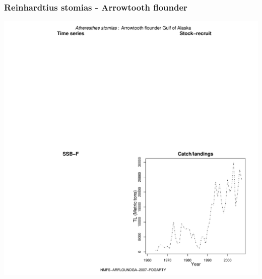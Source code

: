 \subsubsection{Reinhardtius stomias - Arrowtooth flounder}
\begin{center}
\includegraphics[width=1.2\textwidth]{../R/figures/NMFS-ARFLOUNDGA-2007-FOGARTY.pdf}
\end{center}

